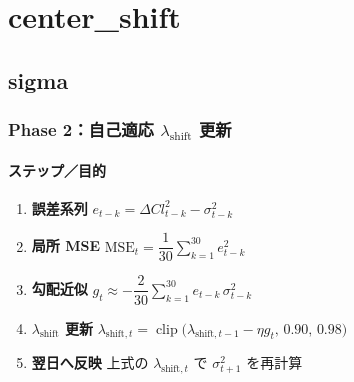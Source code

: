 
\section*{center\_shift}\nopagebreak[4]

\subsection*{sigma}\nopagebreak[4]

\subsubsection*{Phase 2：自己適応 $\lambda_{\text{shift}}$ 更新}\nopagebreak[4]
\paragraph{ステップ／目的}
\begin{flushleft}
\begin{enumerate}
  \item \textbf{誤差系列}\;
        \(e_{t-k}=\Delta Cl_{t-k}^{2}-\sigma_{t-k}^{2}\)
  \item \textbf{局所 MSE}\;
        \(\mathrm{MSE}_t=\dfrac{1}{30}\sum_{k=1}^{30}e_{t-k}^{2}\)
  \item \textbf{勾配近似}\;
        \(g_t\approx-\dfrac{2}{30}\sum_{k=1}^{30}
          e_{t-k}\,\sigma_{t-k}^{2}\)
  \item \textbf{$\lambda_{\text{shift}}$ 更新}\;
        \(\lambda_{\text{shift},t}
          =\operatorname{clip}\bigl(
            \lambda_{\text{shift},t-1}-\eta g_t,\,
            0.90,\,0.98\bigr)\)
  \item \textbf{翌日へ反映}\;
        上式の \(\lambda_{\text{shift},t}\) で  
        \(\sigma_{t+1}^{2}\) を再計算
\end{enumerate}
\end{flushleft}

